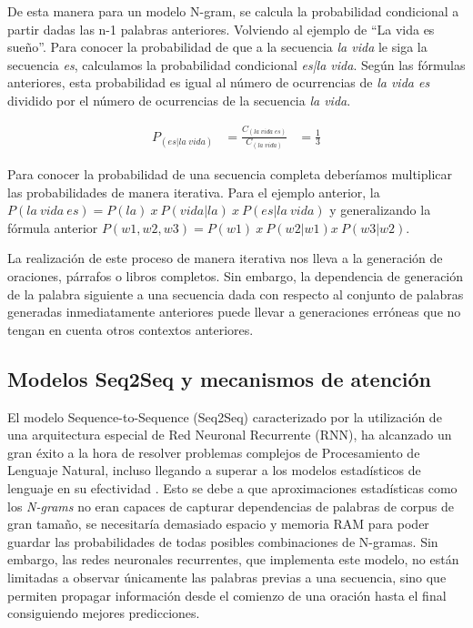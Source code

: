 De esta manera para un modelo N-gram, se calcula la probabilidad condicional a partir dadas las n-1 palabras anteriores. Volviendo al ejemplo de ``La vida es sueño''. Para conocer la probabilidad de que a la secuencia \textit{la vida} le siga la secuencia \textit{es}, calculamos la probabilidad condicional \textit{es|la vida}. Según las fórmulas anteriores, esta probabilidad es igual al número de ocurrencias de \textit{la vida es} dividido por el número de ocurrencias de la secuencia \textit{la vida}.

\begin{equation}
	\label{eq:probabilidadesngram_ejemplo}
	\begin{aligned}
		P_{(es|la\;vida)} & = \frac{C_{(la\;vida\;es)}}{C_{(la\;vida)}}  &= \frac{1}{3}
	\end{aligned}
\end{equation}

Para conocer la probabilidad de una secuencia completa deberíamos multiplicar las probabilidades de manera iterativa. Para el ejemplo anterior, la $P(la\:vida\:es)= P(la)\:x\:P(vida|la)\:x\:P(es|la\:vida)$ y generalizando la fórmula anterior  $P(w1, w2, w3)= P(w1)\:x\:P(w2|w1)x\:P(w3|w2)$.

La realización de este proceso de manera iterativa nos lleva a la generación de oraciones, párrafos o libros completos. Sin embargo, la dependencia de generación de la palabra siguiente a una secuencia dada con respecto al conjunto de palabras generadas inmediatamente anteriores puede llevar a generaciones erróneas que no tengan en cuenta otros contextos anteriores.


\subsection{Modelos Seq2Seq y mecanismos de atención}
El modelo Sequence-to-Sequence (Seq2Seq) caracterizado por la utilización de una arquitectura especial de Red Neuronal Recurrente (RNN), ha alcanzado un gran éxito a la hora de resolver problemas complejos de Procesamiento de Lenguaje Natural, incluso llegando a superar a los modelos estadísticos de lenguaje en su efectividad \citep{analytics_vidhya_2020}. Esto se debe a que aproximaciones estadísticas como los \textit{N-grams} no eran capaces de capturar dependencias de palabras de corpus de gran tamaño, se necesitaría demasiado espacio y memoria RAM para poder guardar las probabilidades de todas posibles combinaciones de N-gramas. Sin embargo, las redes neuronales recurrentes, que implementa este modelo, no están limitadas a observar únicamente las palabras previas a una secuencia, sino que permiten propagar información desde el comienzo de una oración hasta el final consiguiendo mejores predicciones.



